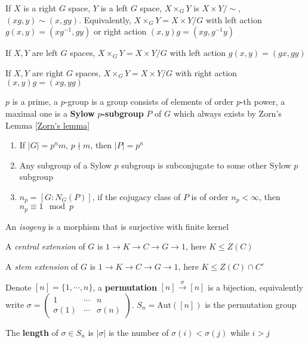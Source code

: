 \documentclass[main]{subfiles}
\begin{document}
\begin{definition}
If $X$ is a right $G$ space, $Y$ is a left $G$ space, $X\times_GY$ is $X\times Y/\sim$, $(xg,y)\sim(x,gy)$. Equivalently, $X\times_G Y=X\times Y/G$ with left action $g(x,y)=(xg^{-1},gy)$ or right action $(x,y)g=(xg,g^{-1}y)$ \par
If $X,Y$ are left $G$ spaces, $X\times_G Y=X\times Y/G$ with left action $g(x,y)=(gx,gy)$ \par
If $X,Y$ are right $G$ spaces, $X\times_G Y=X\times Y/G$ with right action $(x,y)g=(xg,yg)$
\end{definition}

\begin{theorem}\label{Sylow's theorem}
$p$ is a prime, a $p$-group is a group consists of elements of order $p$-th power, a maximal one is a \textbf{Sylow} $p$\textbf{-subgroup} $P$ of $G$ which always exists by Zorn's Lemma \ref{Zorn's lemma}
\begin{enumerate}[label=\textbf{\arabic*.}, leftmargin=*]
\item If $|G|=p^nm$, $p\nmid m$, then $|P|=p^n$
\item Any subgroup of a Sylow $p$ subgroup is subconjugate to some other Sylow $p$ subgroup
\item $n_p=[G:N_G(P)]$, if the cojugacy class of $P$ is of order $n_p<\infty$, then $n_p\equiv 1\mod p$
\end{enumerate}
\end{theorem}

\begin{definition}
An \textit{isogeny} is a morphism that is surjective with finite kernel
\end{definition}

\begin{definition}
A \textit{central extension} of $G$ is $1\to K\to C\to G\to1$, here $K\leq Z(C)$
\end{definition}

\begin{definition}
A \textit{stem extension} of $G$ is $1\to K\to C\to G\to1$, here $K\leq Z(C)\cap C'$
\end{definition}

\begin{definition}
Denote $[n]=\{1,\cdots,n\}$, a \textbf{permutation} $[n]\xrightarrow\sigma[n]$ is a bijection, equivalently write $\sigma=\begin{pmatrix}
1&\cdots&n \\
\sigma(1)&\cdots&\sigma(n)
\end{pmatrix}$. $S_n=\mathrm{Aut}([n])$ is the permutation group \par
The \textbf{length} of $\sigma\in S_n$ is $|\sigma|$ is the number of $\sigma(i)<\sigma(j)$ while $i>j$
\end{definition}
\end{document}
